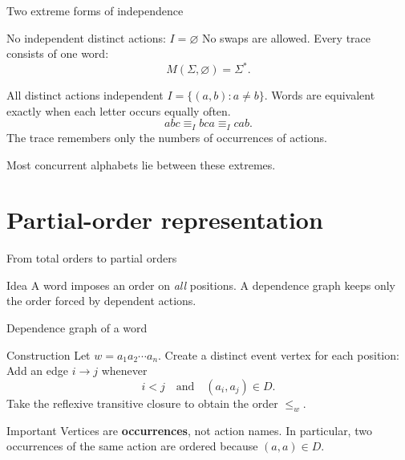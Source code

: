 \documentclass[t,11pt]{beamer}
\begin{document}
\begin{frame}{Two extreme forms of independence}
  \begin{block}{No independent distinct actions: $I=\varnothing$}
    No swaps are allowed. Every trace consists of one word:
    \[
      M(\Sigma,\varnothing)=\Sigma^*.
    \]
  \end{block}
  \begin{block}{All distinct actions independent}
    $I=\{(a,b):a\neq b\}$. Words are equivalent exactly when each letter occurs equally often.
    \[
      abc\equiv_I bca\equiv_I cab.
    \]
    The trace remembers only the numbers of occurrences of actions.
  \end{block}
  Most concurrent alphabets lie between these extremes.
\end{frame}



\section{Partial-order representation}

\begin{frame}{From total orders to partial orders}
  \begin{center}
  \end{center}
  \begin{block}{Idea}
    A word imposes an order on \emph{all} positions. A dependence graph keeps only the order forced by dependent actions.
  \end{block}
\end{frame}

\begin{frame}{Dependence graph of a word}
  \begin{block}{Construction}
    Let $w=a_1a_2\cdots a_n$. Create a distinct event vertex for each position:
    Add an edge $i\to j$ whenever
    \[
       i<j\quad\text{and}\quad (a_i,a_j)\in D.
    \]
    Take the reflexive transitive closure to obtain the order $\leq_w$.
  \end{block}
  \begin{block}{Important}
    Vertices are \textbf{occurrences}, not action names. In particular, two occurrences of the same action are ordered because $(a,a)\in D$.
  \end{block}
\end{frame}
\end{document}
